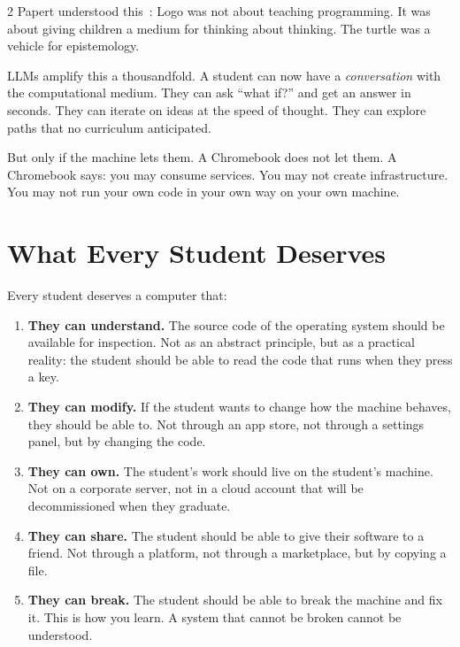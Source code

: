 \documentclass[11pt, a4paper]{article}
\begin{document}
\begin{multicols}{2}
Papert understood this~\citep{papert1980mindstorms}: Logo was not about teaching programming. It was about giving children a medium for thinking about thinking. The turtle was a vehicle for epistemology.

LLMs amplify this a thousandfold. A student can now have a \emph{conversation} with the computational medium. They can ask ``what if?'' and get an answer in seconds. They can iterate on ideas at the speed of thought. They can explore paths that no curriculum anticipated.

But only if the machine lets them. A Chromebook does not let them. A Chromebook says: you may consume services. You may not create infrastructure. You may not run your own code in your own way on your own machine.


\section{What Every Student Deserves}

Every student deserves a computer that:

\begin{enumerate}
  \item \textbf{They can understand.} The source code of the operating system should be available for inspection. Not as an abstract principle, but as a practical reality: the student should be able to read the code that runs when they press a key.

  \item \textbf{They can modify.} If the student wants to change how the machine behaves, they should be able to. Not through an app store, not through a settings panel, but by changing the code.

  \item \textbf{They can own.} The student's work should live on the student's machine. Not on a corporate server, not in a cloud account that will be decommissioned when they graduate.

  \item \textbf{They can share.} The student should be able to give their software to a friend. Not through a platform, not through a marketplace, but by copying a file.

  \item \textbf{They can break.} The student should be able to break the machine and fix it. This is how you learn. A system that cannot be broken cannot be understood.


\end{enumerate}
\end{multicols}
\end{document}
